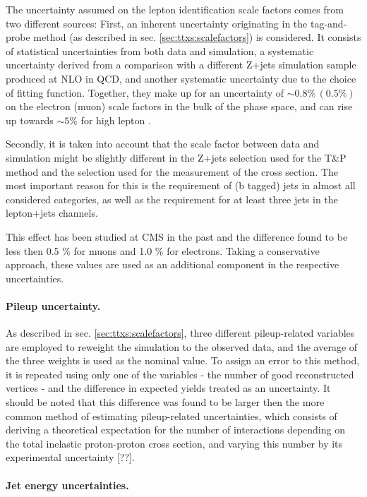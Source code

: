 The uncertainty assumed on the lepton identification scale factors comes from two different sources: First, an inherent uncertainty originating in the tag-and-probe method (as described in sec. \ref{sec:ttxs:scalefactors}) is considered. It consists of statistical uncertainties from both data and simulation, a systematic uncertainty derived from a comparison with a different Z+jets simulation sample produced at NLO in QCD, and another systematic uncertainty due to the choice of fitting function. Together, they make up for an uncertainty of $\sim 0.8\% \, (0.5\%)$ on the electron (muon) scale factors in the bulk of the phase space, and can rise up towards $\sim 5\%$ for high lepton \pt.

Secondly, it is taken into account that the scale factor between data and simulation might be slightly different in the Z+jets selection used for the T\&P method and the \ttbar selection used for the measurement of the cross section. The most important reason for this is the requirement of (b tagged) jets in almost all considered categories, as well as the requirement for at least three jets in the lepton+jets channels. 

This effect has been studied at CMS in the past and the difference found to be less then 0.5 \% for muons and 1.0 \% for electrons. Taking a conservative approach, these values are used as an additional component in the respective uncertainties.

\paragraph{Pileup uncertainty.}

As described in sec. \ref{sec:ttxs:scalefactors}, three different pileup-related variables are employed to reweight the simulation to the observed data, and the average of the three weights is used as the nominal value. To assign an error to this method, it is repeated using only one of the variables - the number of good reconstructed vertices - and the difference in expected yields treated as an uncertainty. It should be noted that this difference was found to be larger then the more common method of estimating pileup-related uncertainties, which consists of deriving a theoretical expectation for the number of interactions depending on the total inelastic proton-proton cross section, and varying this number by its experimental uncertainty [??].

\paragraph{Jet energy uncertainties.}

